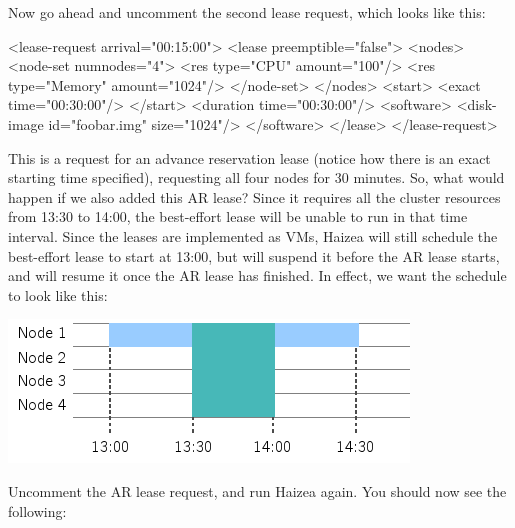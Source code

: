 Now go ahead and uncomment the second lease request, which looks like this:

\begin{wideshellverbatim}
<lease-request arrival="00:15:00">
<lease preemptible="false">
	<nodes>
		<node-set numnodes="4">
			<res type="CPU" amount="100"/>
			<res type="Memory" amount="1024"/>
		</node-set>
	</nodes>
	<start>
		<exact time="00:30:00"/>
	</start>
	<duration time="00:30:00"/>
	<software>
		<disk-image id="foobar.img" size="1024"/>
	</software>
</lease>
</lease-request>
\end{wideshellverbatim}

This is a request for an advance reservation lease (notice how there is an exact starting time specified), requesting all four nodes for 30 minutes. So, what would happen if we also added this AR lease? Since it requires all the cluster resources from 13:30 to 14:00, the best-effort lease will be unable to run in that time interval. Since the leases are implemented as VMs, Haizea will still schedule the best-effort lease to start at 13:00, but will suspend it before the AR lease starts, and will resume it once the AR lease has finished. In effect, we want the schedule to look like this:

\begin{center}
\includegraphics{images/quickstart_leasegraph3.png}
\end{center}

Uncomment the AR lease request, and run Haizea again. You should now see the following:

